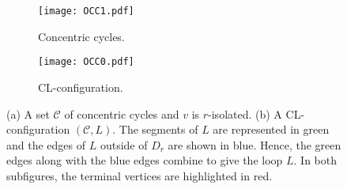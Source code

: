 \documentclass{article}
\numberwithin{claimcounter}{lemma}
\begin{document}
\begin{figure}
\centering
\begin{subfigure}{.5\textwidth}
  \centering
  \captionsetup{justification=centering}
    \texttt{[image: OCC1.pdf]}
  \caption{Concentric cycles.}
  \label{fig:OC1}
\end{subfigure}\begin{subfigure}{.5\textwidth}
  \centering
  \captionsetup{justification=centering}
  \texttt{[image: OCC0.pdf]}
  \caption{CL-configuration.}
  \label{fig:OC2}
\end{subfigure}
\caption{(a) A set $\mathcal{C}$  of concentric cycles and $v$ is $r$-isolated. (b) A CL-configuration $(\mathcal{C},L)$. The segments of $L$ are represented in  green and the edges of $L$ outside of $D_r$ are shown in blue. Hence, the green edges along with the blue edges combine to give the loop $L$. In both subfigures, the terminal vertices are highlighted in red.} 
\label{fig:test}
\end{figure}
\end{document}
